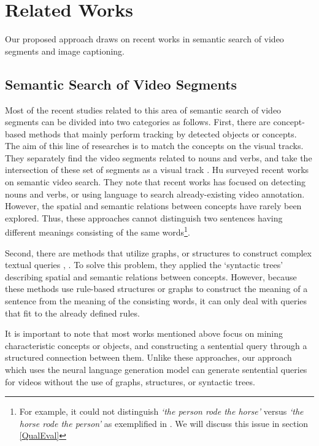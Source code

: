 \section{Related Works}

Our proposed approach draws on recent works in semantic search of video segments and image captioning.

\subsection{Semantic Search of Video Segments} 

Most of the recent studies related to this area of semantic search of video segments can be divided into two categories as follows. First, there are concept-based methods that mainly perform tracking by detected objects or concepts. The aim of this line of researches is to match the concepts on the visual tracks. They separately find the video segments related to nouns and verbs, and take the intersection of these set of segments as a visual track \cite{christel2004exploiting, worring2007mediamill, snoek2007learned, tapaswi2014story, aytar2008utilizing}. 
%
Hu \etal \cite{hu2011survey} surveyed recent works on semantic video search. They note that recent works has focused on detecting nouns and verbs, or using language to search already-existing video annotation. However, the spatial and semantic relations between concepts have rarely been explored. %
Thus, these approaches cannot distinguish two sentences having different meanings consisting of the same words\footnote{For example, it could not distinguish \textit{`the person rode the horse'} versus \textit{`the horse rode the person'} as exemplified in \cite{barrett2016saying}. We will discuss this issue in section \ref{QualEval}}.

Second, there are methods that utilize graphs, or structures to construct complex textual queries \cite{barrett2016saying}, \cite{lin2014visual}.
To solve this problem, they applied the `syntactic trees' describing spatial and semantic relations between concepts.
However, because these methods use rule-based structures or graphs to construct the meaning of a sentence from the meaning of the consisting words, it can only deal with queries that fit to the already defined rules.

It is important to note that most works mentioned above focus on mining characteristic concepts or objects, and constructing a sentential query through a structured connection between them. Unlike these approaches, our approach which uses the neural language generation model can generate sentential queries for videos without the use of graphs, structures, or syntactic trees.


